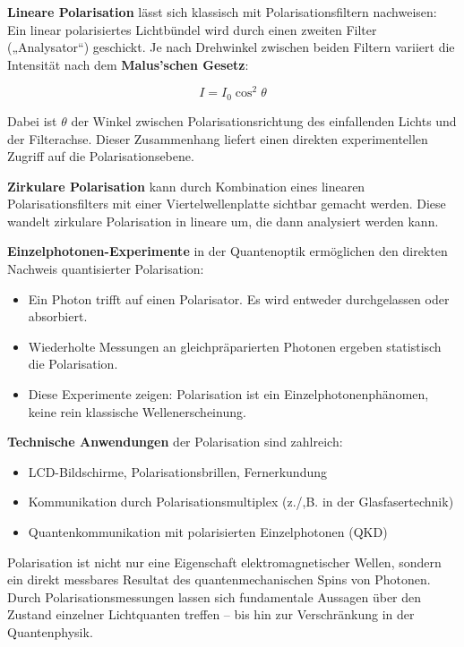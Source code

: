 \vspace{0.5em}
\textbf{Lineare Polarisation} lässt sich klassisch mit Polarisationsfiltern nachweisen: Ein linear polarisiertes Lichtbündel wird durch einen zweiten Filter („Analysator“) geschickt. Je nach Drehwinkel zwischen beiden Filtern variiert die Intensität nach dem \textbf{Malus’schen Gesetz}:

\[
I = I_0 \cos^2\theta
\]

Dabei ist \( \theta \) der Winkel zwischen Polarisationsrichtung des einfallenden Lichts und der Filterachse. Dieser Zusammenhang liefert einen direkten experimentellen Zugriff auf die Polarisationsebene.

\vspace{0.5em}
\textbf{Zirkulare Polarisation} kann durch Kombination eines linearen Polarisationsfilters mit einer Viertelwellenplatte sichtbar gemacht werden. Diese wandelt zirkulare Polarisation in lineare um, die dann analysiert werden kann.

\vspace{0.5em}
\textbf{Einzelphotonen-Experimente} in der Quantenoptik ermöglichen den direkten Nachweis quantisierter Polarisation:
\begin{itemize}
	\item Ein Photon trifft auf einen Polarisator. Es wird entweder durchgelassen oder absorbiert.
	\item Wiederholte Messungen an gleichpräparierten Photonen ergeben statistisch die Polarisation.
	\item Diese Experimente zeigen: Polarisation ist ein Einzelphotonenphänomen, keine rein klassische Wellenerscheinung.
\end{itemize}

\vspace{0.5em}
\textbf{Technische Anwendungen} der Polarisation sind zahlreich:
\begin{itemize}
	\item LCD-Bildschirme, Polarisationsbrillen, Fernerkundung
	\item Kommunikation durch Polarisationsmultiplex (z./,B. in der Glasfasertechnik)
	\item Quantenkommunikation mit polarisierten Einzelphotonen (QKD)
\end{itemize}

\begin{tcolorbox}[physikbox, title=Was uns die Polarisation über Photonen verrät ]
	\label{box:Was uns die}
	Polarisation ist nicht nur eine Eigenschaft elektromagnetischer Wellen, sondern ein direkt messbares Resultat des quantenmechanischen Spins von Photonen. Durch Polarisationsmessungen lassen sich fundamentale Aussagen über den Zustand einzelner Lichtquanten treffen – bis hin zur Verschränkung in der Quantenphysik.
\end{tcolorbox}

